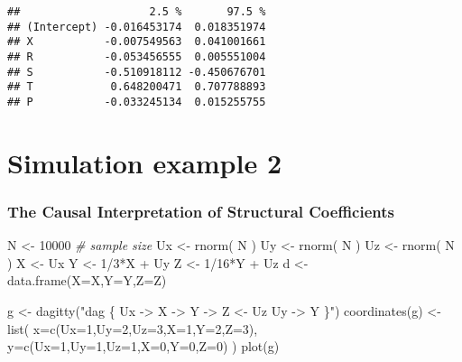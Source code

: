 \documentclass[
]{article}
\newenvironment{Shaded}{\begin{snugshade}}{\end{snugshade}}
\newcommand{\AttributeTok}[1]{\textcolor[rgb]{0.77,0.63,0.00}{#1}}
\newcommand{\CommentTok}[1]{\textcolor[rgb]{0.56,0.35,0.01}{\textit{#1}}}
\newcommand{\DecValTok}[1]{\textcolor[rgb]{0.00,0.00,0.81}{#1}}
\newcommand{\FunctionTok}[1]{\textcolor[rgb]{0.00,0.00,0.00}{#1}}
\newcommand{\NormalTok}[1]{#1}
\newcommand{\OtherTok}[1]{\textcolor[rgb]{0.56,0.35,0.01}{#1}}
\newcommand{\SpecialCharTok}[1]{\textcolor[rgb]{0.00,0.00,0.00}{#1}}
\newcommand{\StringTok}[1]{\textcolor[rgb]{0.31,0.60,0.02}{#1}}
\begin{document}
\begin{verbatim}
##                    2.5 %       97.5 %
## (Intercept) -0.016453174  0.018351974
## X           -0.007549563  0.041001661
## R           -0.053456555  0.005551004
## S           -0.510918112 -0.450676701
## T            0.648200471  0.707788893
## P           -0.033245134  0.015255755
\end{verbatim}

\hypertarget{simulation-example-2}{%
\section{Simulation example 2}\label{simulation-example-2}}

\hypertarget{the-causal-interpretation-of-structural-coefficients}{%
\subsubsection{The Causal Interpretation of Structural
Coefficients}\label{the-causal-interpretation-of-structural-coefficients}}

\begin{Shaded}
\begin{Highlighting}[]
\NormalTok{N }\OtherTok{\textless{}{-}} \DecValTok{10000} \CommentTok{\# sample size}
\NormalTok{Ux }\OtherTok{\textless{}{-}} \FunctionTok{rnorm}\NormalTok{( N )}
\NormalTok{Uy }\OtherTok{\textless{}{-}} \FunctionTok{rnorm}\NormalTok{( N )}
\NormalTok{Uz }\OtherTok{\textless{}{-}} \FunctionTok{rnorm}\NormalTok{( N )}
\NormalTok{X }\OtherTok{\textless{}{-}}\NormalTok{ Ux}
\NormalTok{Y }\OtherTok{\textless{}{-}} \DecValTok{1}\SpecialCharTok{/}\DecValTok{3}\SpecialCharTok{*}\NormalTok{X }\SpecialCharTok{+}\NormalTok{ Uy}
\NormalTok{Z }\OtherTok{\textless{}{-}} \DecValTok{1}\SpecialCharTok{/}\DecValTok{16}\SpecialCharTok{*}\NormalTok{Y }\SpecialCharTok{+}\NormalTok{ Uz}
\NormalTok{d }\OtherTok{\textless{}{-}} \FunctionTok{data.frame}\NormalTok{(}\AttributeTok{X=}\NormalTok{X,}\AttributeTok{Y=}\NormalTok{Y,}\AttributeTok{Z=}\NormalTok{Z)}

\NormalTok{g }\OtherTok{\textless{}{-}} \FunctionTok{dagitty}\NormalTok{(}\StringTok{"dag \{}
\StringTok{    Ux {-}\textgreater{} X {-}\textgreater{} Y {-}\textgreater{} Z \textless{}{-} Uz}
\StringTok{    Uy {-}\textgreater{} Y}
\StringTok{\}"}\NormalTok{)}
\FunctionTok{coordinates}\NormalTok{(g) }\OtherTok{\textless{}{-}} \FunctionTok{list}\NormalTok{(}
  \AttributeTok{x=}\FunctionTok{c}\NormalTok{(}\AttributeTok{Ux=}\DecValTok{1}\NormalTok{,}\AttributeTok{Uy=}\DecValTok{2}\NormalTok{,}\AttributeTok{Uz=}\DecValTok{3}\NormalTok{,}\AttributeTok{X=}\DecValTok{1}\NormalTok{,}\AttributeTok{Y=}\DecValTok{2}\NormalTok{,}\AttributeTok{Z=}\DecValTok{3}\NormalTok{),}
  \AttributeTok{y=}\FunctionTok{c}\NormalTok{(}\AttributeTok{Ux=}\DecValTok{1}\NormalTok{,}\AttributeTok{Uy=}\DecValTok{1}\NormalTok{,}\AttributeTok{Uz=}\DecValTok{1}\NormalTok{,}\AttributeTok{X=}\DecValTok{0}\NormalTok{,}\AttributeTok{Y=}\DecValTok{0}\NormalTok{,}\AttributeTok{Z=}\DecValTok{0}\NormalTok{) )}
\FunctionTok{plot}\NormalTok{(g)}
\end{Highlighting}
\end{Shaded}
\end{document}
